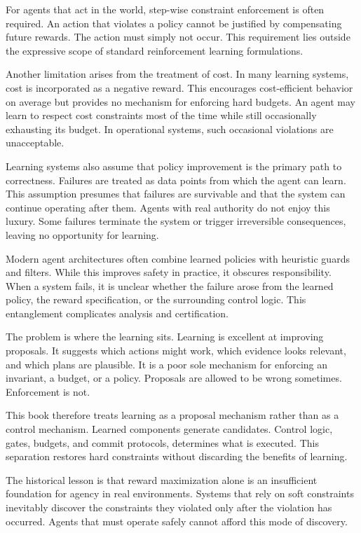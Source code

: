 For agents that act in the world, step-wise constraint enforcement is often
required. An action that violates a policy cannot be justified by compensating
future rewards. The action must simply not occur. This requirement lies outside
the expressive scope of standard reinforcement learning formulations.

Another limitation arises from the treatment of cost. In many learning systems,
cost is incorporated as a negative reward. This encourages cost-efficient behavior
on average but provides no mechanism for enforcing hard budgets. An agent may
learn to respect cost constraints most of the time while still occasionally
exhausting its budget. In operational systems, such occasional violations are
unacceptable.

Learning systems also assume that policy improvement is the primary path to
correctness. Failures are treated as data points from which the agent can learn.
This assumption presumes that failures are survivable and that the system can
continue operating after them. Agents with real authority do not enjoy this
luxury. Some failures terminate the system or trigger irreversible consequences,
leaving no opportunity for learning.

Modern agent architectures often combine learned policies with heuristic guards
and filters. While this improves safety in practice, it obscures responsibility.
When a system fails, it is unclear whether the failure arose from the learned
policy, the reward specification, or the surrounding control logic. This
entanglement complicates analysis and certification.

The problem is where the learning sits. Learning is excellent at improving proposals. It suggests which actions might work, which evidence looks relevant, and which plans are plausible. It is a poor sole mechanism for enforcing an invariant, a budget, or a policy. Proposals are allowed to be wrong sometimes. Enforcement is
not.

This book therefore treats learning as a proposal mechanism rather than as a
control mechanism. Learned components generate candidates. Control logic, gates,
budgets, and commit protocols, determines what is executed. This separation
restores hard constraints without discarding the benefits of learning.

The historical lesson is that reward maximization alone is an insufficient
foundation for agency in real environments. Systems that rely on soft constraints
inevitably discover the constraints they violated only after the violation has
occurred. Agents that must operate safely cannot afford this mode of discovery.

